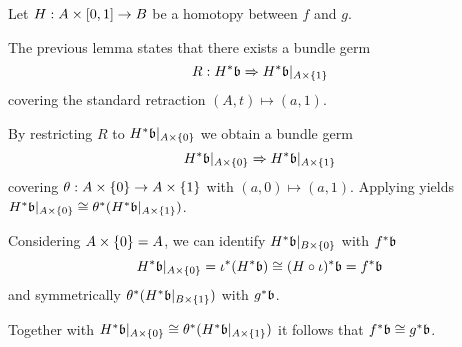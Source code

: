 \begin{scope}
\begin{myproof}
    Let $H: A \times{} [0, 1] \to B$ be a homotopy between $f$ and $g$.

    The previous lemma states that there exists a bundle germ
    \[ R: H^*\mathfrak{b} \Rightarrow{}{} H^*\mathfrak{b}\vert_{A \times{} \{1\}} \]
    covering the standard retraction $(A, t) \mapsto (a, 1)$.

    By restricting $R$ to $H^*\mathfrak{b}\vert_{A \times{} \{0\}}$ we obtain a bundle germ
    \[ H^*\mathfrak{b}\vert_{A \times{} \{0\}} \Rightarrow{}{} H^*\mathfrak{b}\vert_{A \times{} \{1\}} \]
    covering $\theta: A \times{} \{0\} \to A \times{} \{1\}$ with $(a, 0) \mapsto (a, 1)$.
    Applying  yields $H^*\mathfrak{b}\vert_{A \times{} \{0\}} \cong \theta^*(H^*\mathfrak{b}\vert_{A \times{} \{1\}})$.

    Considering $A \times{} \{0\} = A$, we can identify $H^*\mathfrak{b}\vert_{B \times{} \{0\}}$ with $f^*\mathfrak{b}$
    \[ H^*\mathfrak{b}\vert_{A \times \{0\}} = \iota^*(H^*\mathfrak{b}) \cong (H \circ \iota)^*\mathfrak{b} = f^*\mathfrak{b} \]
    and symmetrically $\theta^*(H^*\mathfrak{b}\vert_{B \times{} \{1\}})$ with $g^*\mathfrak{b}$.

    Together with $H^*\mathfrak{b}\vert_{A \times{} \{0\}} \cong \theta^*(H^*\mathfrak{b}\vert_{A \times{} \{1\}})$ it follows that $f^*\mathfrak{b} \cong g^*\mathfrak{b}$.
\end{myproof}

\end{scope}